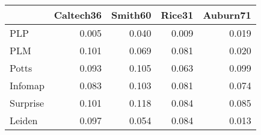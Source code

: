 \begin{tabular}{lrrrr}
\toprule
{} & Caltech36 & Smith60 & Rice31 & Auburn71 \\
\midrule
PLP      &     0.005 &   0.040 &  0.009 &    0.019 \\
PLM      &     0.101 &   0.069 &  0.081 &    0.020 \\
Potts    &     0.093 &   0.105 &  0.063 &    0.099 \\
Infomap  &     0.083 &   0.103 &  0.081 &    0.074 \\
Surprise &     0.101 &   0.118 &  0.084 &    0.085 \\
Leiden   &     0.097 &   0.054 &  0.084 &    0.013 \\
\bottomrule
\end{tabular}
